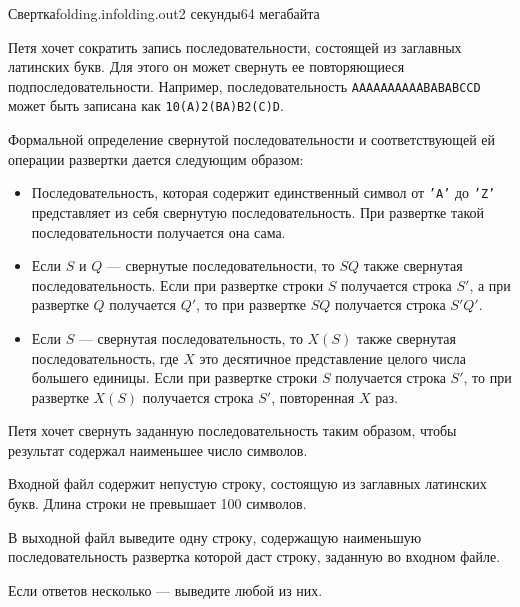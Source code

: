 \begin{problem}{Свертка}{folding.in}{folding.out}{2 секунды}{64 мегабайта}

Петя хочет сократить запись последовательности, состоящей из заглавных латинских букв.
Для этого он может свернуть ее повторяющиеся подпоследовательности. Например, последовательность
\texttt{AAAAAAAAAABABABCCD} может быть записана как \texttt{10(A)2(BA)B2(C)D}.

Формальной определение свернутой последовательности и соответствующей ей операции
развертки дается следующим образом:
\begin{itemize}
\item Последовательность, которая содержит единственный символ от
\texttt{'A'} до \texttt{'Z'} представляет из себя свернутую последовательность.
При развертке такой последовательности получается она сама.
\item Если $S$ и $Q$ --- свернутые последовательности, то $SQ$ также свернутая последовательность.
Если при развертке строки $S$ получается строка $S'$, а при развертке $Q$ получается $Q'$, то
при развертке $SQ$ получается строка $S'Q'$.
\item Если $S$ --- свернутая последовательность, то $X(S)$ также свернутая последовательность,
где $X$ это десятичное представление целого числа большего единицы.
Если при развертке строки $S$ получается строка $S'$, то при развертке $X(S)$ получается
строка $S'$, повторенная $X$ раз.
\end{itemize}

Петя хочет свернуть заданную последовательность таким образом, чтобы результат
содержал наименьшее число символов.

\InputFile

Входной файл содержит непустую строку, состоящую из заглавных латинских букв.
Длина строки не превышает 100 символов.

\OutputFile

В выходной файл выведите одну строку, содержащую наименьшую последовательность
развертка которой даст строку, заданную во входном файле.

Если ответов несколько --- выведите любой из них.


\Example

\begin{example}
%
%
\end{example}

\end{problem}